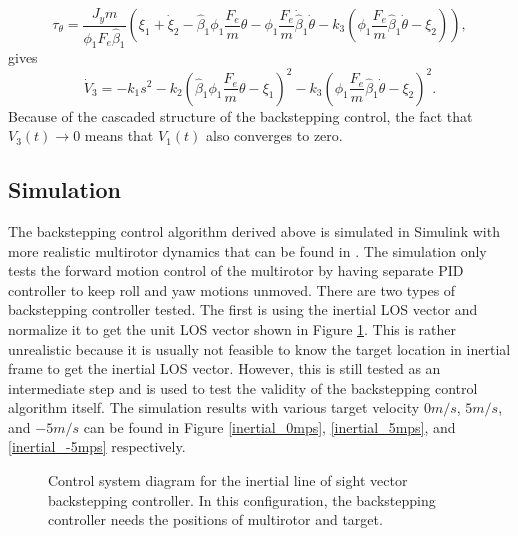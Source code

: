 \begin{equation}
\tau_\theta=\frac{J_ym}{\phi_1F_e\hat{\beta}_1}
(\xi_1+\dot{\xi}_2-\hat{\beta}_1\phi_1\frac{F_e}{m}\theta-\phi_1\frac{F_e}{m}\dot{\hat{\beta}}_1\dot{\theta}-k_3(\phi_1\frac{F_e}{m}\hat{\beta}_1\dot{\theta}-\xi_2)),
\end{equation}
gives
\begin{equation}
\dot{V}_3=-k_1s^2-k_2(\hat{\beta}_1\phi_1\frac{F_e}{m}\theta-\xi_1)^2-k_3(\phi_1\frac{F_e}{m}\hat{\beta}_1\dot{\theta}-\xi_2)^2.
\end{equation}
Because of the cascaded structure of the backstepping control, the fact that $V_3(t)\rightarrow 0$ means that $V_1(t)$ also converges to zero.

\subsection{Simulation}
The backstepping control algorithm derived above is simulated in Simulink with more realistic multirotor dynamics that can be found in {\cite{Beard2008}}. The simulation only tests the forward motion control of the multirotor by having separate PID controller to keep roll and yaw motions unmoved. There are two types of backstepping controller tested. The first is using the inertial LOS vector and normalize it to get the unit LOS vector shown in Figure \ref{system_inertial}. This is rather unrealistic because it is usually not feasible to know the target location in inertial frame to get the inertial LOS vector. However, this is still tested as an intermediate step and is used to test the validity of the backstepping control algorithm itself. The simulation results with various target velocity $0m/s$, $5m/s$, and $-5m/s$ can be found in Figure \ref{inertial_0mps}, \ref{inertial_5mps}, and \ref{inertial_-5mps} respectively.
\begin{figure}[htbp]
	\centering
	\caption{Control system diagram for the inertial line of sight vector backstepping controller. In this configuration, the backstepping controller needs the positions of multirotor and target.}
	\label{system_inertial}
\end{figure}

